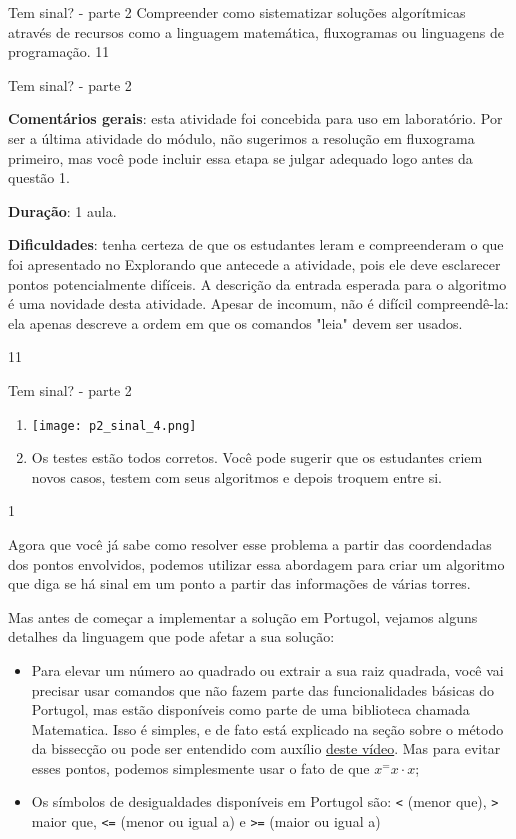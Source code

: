 \label{comp-exp11}
\begin{objectives}{Tem sinal? - parte 2}
{
Compreender como sistematizar soluções algorítmicas através de recursos como a linguagem matemática, fluxogramas ou linguagens de programação.
}{1}{1}
\end{objectives}
\begin{sugestions}{Tem sinal? - parte 2}
{
\textbf{Comentários gerais}: esta atividade foi concebida para uso em laboratório. Por ser a última atividade do módulo, não sugerimos a resolução em fluxograma primeiro, mas você pode incluir essa etapa se julgar adequado logo antes da questão 1.

\textbf{Duração}: 1 aula.

\textbf{Dificuldades}: tenha certeza de que os estudantes leram e compreenderam o que foi apresentado no Explorando que antecede a atividade, pois ele deve esclarecer pontos potencialmente difíceis. A descrição da entrada esperada para o algoritmo é uma novidade desta atividade. Apesar de incomum, não é difícil compreendê-la: ela apenas descreve a ordem em que os comandos "leia"{} devem ser usados.
}{1}{1}
\end{sugestions}
\begin{answer}{Tem sinal? - parte 2}
{

\begin{enumerate}
\item {}
{
\texttt{[image: p2\_sinal\_4.png]}
}

\item Os testes estão todos corretos. Você pode sugerir que os estudantes criem novos casos, testem com seus algoritmos e depois troquem entre si.
\end{enumerate}
}{1}
\end{answer}

Agora que você já sabe como resolver esse problema a partir das coordendadas dos pontos envolvidos, podemos utilizar essa abordagem para criar um algoritmo que diga se há sinal em um ponto a partir das informações de várias torres.

Mas antes de começar a implementar a solução em Portugol, vejamos alguns detalhes da linguagem que pode afetar a sua solução:

\begin{itemize}
\item Para elevar um número ao quadrado ou extrair a sua raiz quadrada, você vai precisar usar comandos que não fazem parte das funcionalidades básicas do Portugol, mas estão disponíveis como parte de uma biblioteca chamada Matematica. Isso é simples, e de fato está explicado na seção sobre o método da bissecção ou pode ser entendido com auxílio \href{https://www.youtube.com/watch?v=rs8ihN08bgU&feature=youtu.be}{deste vídeo}. Mas para evitar esses pontos, podemos simplesmente usar o fato de que $x^=x\cdot x$;
\item Os símbolos de desigualdades disponíveis em Portugol são: \verb|<| (menor que), \verb|>| maior que, \verb|<=| (menor ou igual a) e \verb|>=| (maior ou igual a)
\end{itemize}

